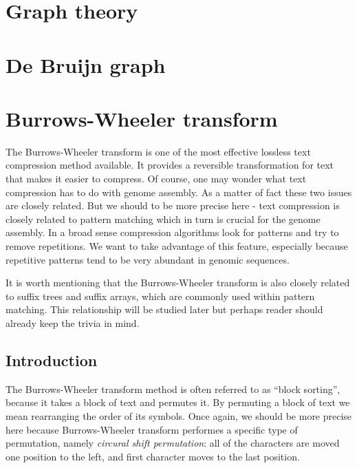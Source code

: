 \documentclass[
]{book}
\begin{document}
\hypertarget{graph}{%
\chapter{Graph theory}\label{graph}}

\hypertarget{bruijn}{%
\chapter{De Bruijn graph}\label{bruijn}}

\hypertarget{bwt}{%
\chapter{Burrows-Wheeler transform}\label{bwt}}

The Burrows-Wheeler transform is one of the most effective lossless text compression method available. It provides a reversible transformation for text that makes it easier to compress. Of course, one may wonder what text compression has to do with genome assembly. As a matter of fact these two issues are closely related. But we should to be more precise here - text compression is closely related to pattern matching which in turn is crucial for the genome assembly. In a broad sense compression algorithms look for patterns and try to remove repetitions. We want to take advantage of this feature, especially because repetitive patterns tend to be very abundant in genomic sequences.

It is worth mentioning that the Burrows-Wheeler transform is also closely related to suffix trees and suffix arrays, which are commonly used within pattern matching. This relationship will be studied later but perhaps reader should already keep the trivia in mind. \citep{bw1}

\hypertarget{introduction-1}{%
\section{Introduction}\label{introduction-1}}

The Burrows-Wheeler transform method is often referred to as ``block sorting'', because it takes a block of text and permutes it. By permuting a block of text we mean rearranging the order of its symbols. Once again, we should be more precise here because Burrows-Wheeler transform performes a specific type of permutation, namely \emph{circural shift permutation}: all of the characters are moved one position to the left, and first character moves to the last position.
\end{document}
